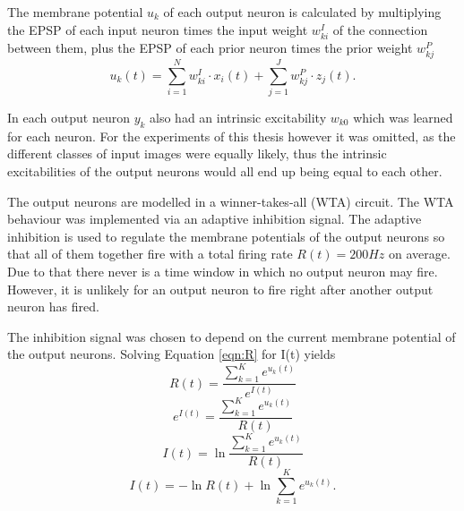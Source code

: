 The membrane potential $u_k$ of each output neuron is calculated by multiplying the EPSP of each input neuron times the input weight $w^{I}_{ki}$ of the connection between them, plus the EPSP of each prior neuron times the prior weight $w^{P}_{kj}$
\begin{equation}
\label{eqn:uk}
u_k(t) = \sum_{i=1}^N w^{I}_{ki} \cdot x_i(t) + \sum_{j=1}^J w^{P}_{kj} \cdot z_j(t).
\end{equation}

In \citet{nessler} each output neuron $y_k$ also had an intrinsic excitability $w_{k0}$ which was learned for each neuron. For the experiments of this thesis however it was omitted, as the different classes of  input images were equally likely, thus the intrinsic excitabilities of the output neurons would all end up being equal to each other.

The output neurons are modelled in a winner-takes-all (WTA) circuit. The WTA behaviour was implemented via an adaptive inhibition signal. The adaptive inhibition is used to regulate the membrane potentials of the output neurons so that all of them together fire with a total firing rate $R(t) = 200 Hz$ on average. Due to that there never is a time window in which no output neuron may fire. However, it is unlikely for an output neuron to fire right after another output neuron has fired.

The inhibition signal was chosen to depend on the current membrane potential of the output neurons. 
Solving Equation \ref{eqn:R} for I(t) yields
\begin{equation}
\label{}
R(t) = \frac{ \sum_{k=1}^K e^{u_k(t)}}{e^{I(t)}}
\end{equation}
\begin{equation}
\label{}
e^{I(t)} = \frac{\sum_{k=1}^K e^{u_k(t)}}{R(t)}
\end{equation}
\begin{equation}
\label{}
I(t) = \ln{ \frac{ \sum_{k=1}^K e^{u_k(t)}}{R(t)}}
\end{equation}
\begin{equation}
\label{eqn:I(t)}
I(t) =  - \ln{R(t)} + \ln{  \sum_{k=1}^K e^{u_k(t)}}.
\end{equation}

